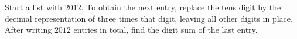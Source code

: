 Start a list with $2012$. To obtain the next entry, replace the tens digit by the decimal representation of three times that digit, leaving all other digits in place. After writing $2012$ entries in total, find the digit sum of the last entry.
